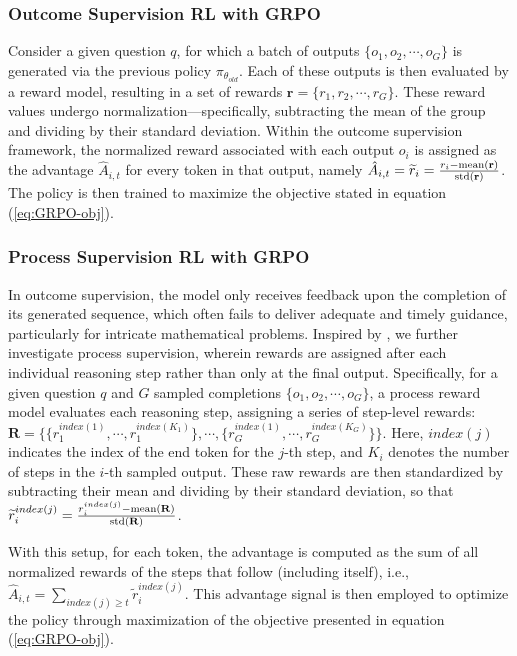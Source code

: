 \begin{itemize}[topsep=0pt]
\begin{itemize}[topsep=0pt]
\subsubsection{Outcome Supervision RL with GRPO} Consider a given question $q$, for which a batch of outputs $\{o_1, o_2, \cdots, o_G\}$ is generated via the previous policy $\pi_{\theta_{old}}$. Each of these outputs is then evaluated by a reward model, resulting in a set of rewards $\mathbf{r}=\{r_1, r_2, \cdots, r_G\}$. These reward values undergo normalization—specifically, subtracting the mean of the group and dividing by their standard deviation. Within the outcome supervision framework, the normalized reward associated with each output $o_i$ is assigned as the advantage $\hat{A}_{i, t}$ for every token in that output, namely $\hat{A}_{i, t} = \widetilde{r}_i = \frac{r_i- {\rm mean}(\mathbf{r})}{{\rm std}(\mathbf{r})}$. The policy is then trained to maximize the objective stated in equation (\ref{eq:GRPO-obj}).

\subsubsection{Process Supervision RL with GRPO}

In outcome supervision, the model only receives feedback upon the completion of its generated sequence, which often fails to deliver adequate and timely guidance, particularly for intricate mathematical problems. Inspired by \cite{wang2023math}, we further investigate process supervision, wherein rewards are assigned after each individual reasoning step rather than only at the final output. Specifically, for a given question $q$ and $G$ sampled completions $\{o_1, o_2, \cdots, o_G\}$, a process reward model evaluates each reasoning step, assigning a series of step-level rewards: $\mathbf{R} = \{ \{r_1^{index(1)},\cdots,r_1^{index(K_1)}\}, \cdots,  \{r_G^{index(1)},\cdots,r_G^{index(K_G)}\} \}$. Here, $index(j)$ indicates the index of the end token for the $j$-th step, and $K_i$ denotes the number of steps in the $i$-th sampled output. These raw rewards are then standardized by subtracting their mean and dividing by their standard deviation, so that $\widetilde{r}_i^{index(j)} = \frac{r_i^{index(j)} - {\rm mean(\mathbf{R})}}{{\rm std(\mathbf{R})}}$.

With this setup, for each token, the advantage is computed as the sum of all normalized rewards of the steps that follow (including itself), i.e., $\hat{A}_{i, t} = \sum_{index(j) \ge t} \widetilde{r}_i^{index(j)}$. This advantage signal is then employed to optimize the policy through maximization of the objective presented in equation (\ref{eq:GRPO-obj}).


\end{itemize}
\end{itemize}
